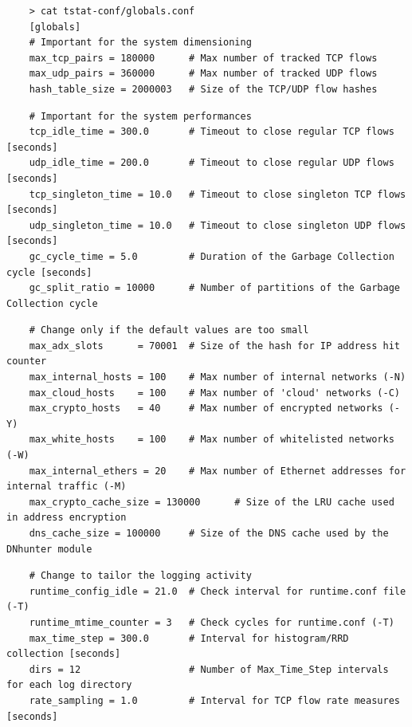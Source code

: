 \documentclass[11pt]{article}
\begin{document}
\begin{small}\begin{verbatim}
    > cat tstat-conf/globals.conf
    [globals]
    # Important for the system dimensioning
    max_tcp_pairs = 180000      # Max number of tracked TCP flows
    max_udp_pairs = 360000      # Max number of tracked UDP flows
    hash_table_size = 2000003   # Size of the TCP/UDP flow hashes
\end{verbatim}\end{small} \noindent
\begin{small}\begin{verbatim}
    # Important for the system performances
    tcp_idle_time = 300.0       # Timeout to close regular TCP flows [seconds]
    udp_idle_time = 200.0       # Timeout to close regular UDP flows [seconds]
    tcp_singleton_time = 10.0   # Timeout to close singleton TCP flows [seconds] 
    udp_singleton_time = 10.0   # Timeout to close singleton UDP flows [seconds]
    gc_cycle_time = 5.0         # Duration of the Garbage Collection cycle [seconds]
    gc_split_ratio = 10000      # Number of partitions of the Garbage Collection cycle
\end{verbatim}\end{small} \noindent
\begin{small}\begin{verbatim}
    # Change only if the default values are too small
    max_adx_slots      = 70001  # Size of the hash for IP address hit counter
    max_internal_hosts = 100    # Max number of internal networks (-N)
    max_cloud_hosts    = 100    # Max number of 'cloud' networks (-C)
    max_crypto_hosts   = 40     # Max number of encrypted networks (-Y)
    max_white_hosts    = 100    # Max number of whitelisted networks (-W)
    max_internal_ethers = 20    # Max number of Ethernet addresses for internal traffic (-M)
    max_crypto_cache_size = 130000      # Size of the LRU cache used in address encryption
    dns_cache_size = 100000     # Size of the DNS cache used by the DNhunter module
\end{verbatim}\end{small} \noindent
\begin{small}\begin{verbatim}
    # Change to tailor the logging activity
    runtime_config_idle = 21.0  # Check interval for runtime.conf file (-T) 
    runtime_mtime_counter = 3   # Check cycles for runtime.conf (-T)
    max_time_step = 300.0       # Interval for histogram/RRD collection [seconds]
    dirs = 12                   # Number of Max_Time_Step intervals for each log directory
    rate_sampling = 1.0         # Interval for TCP flow rate measures [seconds]
\end{verbatim}\end{small} \noindent
\end{document}
